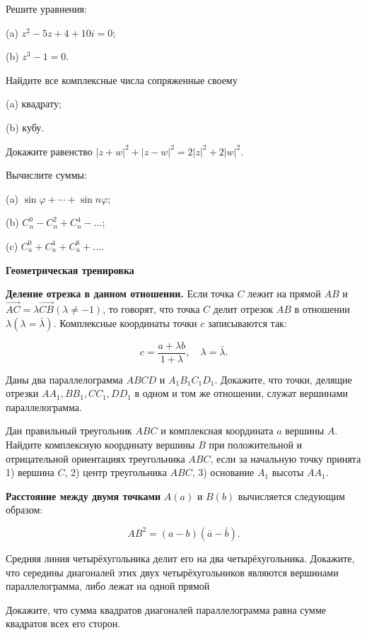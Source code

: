Решите уравнения:

(a) $z^2-5 z+4+10 i=0$;

(b) $z^3-1=0$.

Найдите все комплексные числа сопряженные своему

(a) квадрату;

(b) кубу.

Докажите равенство $|z+w|^2+|z-w|^2=2|z|^2+2|w|^2$.

Вычислите суммы:

(a) $\sin \varphi+\cdots+\sin n \varphi$;

(b) $C_n^0-C_n^2+C_n^4-\ldots$;

(c) $C_n^0+C_n^4+C_n^8+\ldots$.


\newpage

\hspace{3mm}

\textbf{\Large Геометрическая тренировка}

\textbf{Деление отрезка в данном отношении.}
Если точка $C$ лежит на прямой $A B$ и $\overrightarrow{A C}=\lambda \overrightarrow{C B}(\lambda \neq-1)$, то говорят, что точка $C$ делит отрезок $A B$ в отношении $\lambda(\lambda=\bar{\lambda})$. Комплексные координаты точки $c$ записываются так:


$$
c=\frac{a+\lambda b}{1+\lambda}, \quad \lambda=\bar{\lambda} .
$$

Даны два параллелограмма $A B C D$ и $A_1 B_1 C_1 D_1$. Докажите, что точки, делящие отрезки $A A_1, B B_1, C C_1, D D_1$ в одном и том же отношении, служат вершинами параллелограмма.

Дан правильный треугольник $A B C$ и комплексная координата $a$ вершины $A$. Найдите комплексную координату вершины $B$ при положительной и отрицательной ориентациях треугольника $A B C$, если за начальную точку принята 1) вершина $C$, 2) центр треугольника $A B C$, 3) основание $A_1$ высоты $A A_1$.

\textbf{Расстояние между двумя точками} $A(a)$ и $B(b)$ вычисляется следующим образом:

$$
A B^2=(a-b)(\bar{a}-\bar{b}).
$$

Средняя линия четырёхугольника делит его на два четырёхугольника. Докажите, что середины диагоналей этих двух четырёхугольников являются вершинами параллелограмма, либо лежат на одной прямой

Докажите, что сумма квадратов диагоналей параллелограмма равна сумме квадратов всех его сторон.

